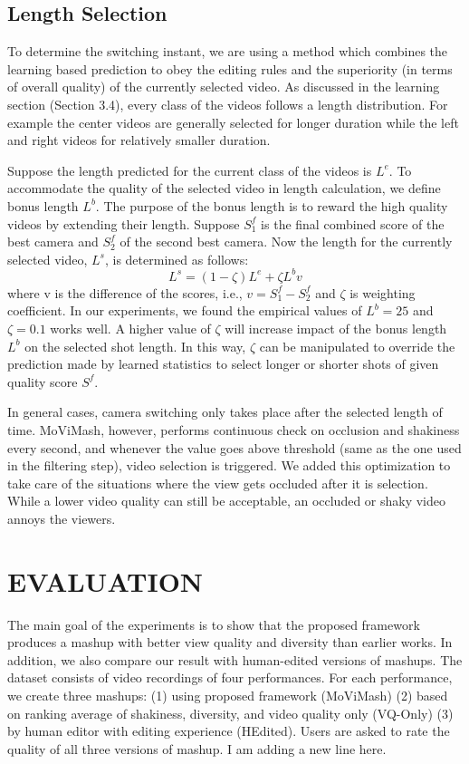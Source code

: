 \documentclass{new}
\begin{document}
\subsection{ Length Selection}
To determine the switching instant, we are using a method which
combines the learning based prediction to obey the editing rules and
the superiority (in terms of overall quality) of the currently selected
video. As discussed in the learning section (Section 3.4), every
class of the videos follows a length distribution. For example the
center videos are generally selected for longer duration while the
left and right videos for relatively smaller duration.

Suppose the length predicted for the current class of the videos
is $L^e$. To accommodate the quality of the selected video in length
calculation, we define bonus length $L^b$. The purpose of the bonus
length is to reward the high quality videos by extending their length.
Suppose $S_1^f$ is the final combined score of the best camera and $S_2^f$ of the second best camera. Now the length for the currently selected video, $L^s$, is determined as follows:
\begin{equation}
    L^s = (1-\zeta)L^e + \zeta L^b v
\end{equation}
where v is the difference of the scores, i.e., $v = S_1^f-S_2^f$ and $\zeta$ is weighting coefficient. In our experiments, we found the empirical values of $L^b = 25 $ and $\zeta = 0.1$ works well. A higher value of $\zeta$ will increase impact of the bonus length $L^b$ on the selected shot length. In this way, $\zeta$ can be manipulated to override the prediction made by learned statistics to select longer or shorter shots of given quality score $S^f$.

In general cases, camera switching only takes place after the selected
length of time. MoViMash, however, performs continuous
check on occlusion and shakiness every second, and whenever the
value goes above threshold (same as the one used in the filtering
step), video selection is triggered. We added this optimization to
take care of the situations where the view gets occluded after it is
selection. While a lower video quality can still be acceptable, an
occluded or shaky video annoys the viewers.

\section{EVALUATION}
The main goal of the experiments is to show that the proposed
framework produces a mashup with better view quality and diversity
than earlier works. In addition, we also compare our result with
human-edited versions of mashups. The dataset consists of video
recordings of four performances. For each performance, we create
three mashups: (1) using proposed framework (MoViMash) (2)
based on ranking average of shakiness, diversity, and video quality only (VQ-Only) (3) by human editor with editing experience (HEdited).
Users are asked to rate the quality of all three versions of
mashup.
I am adding a new line here.
\end{document}

